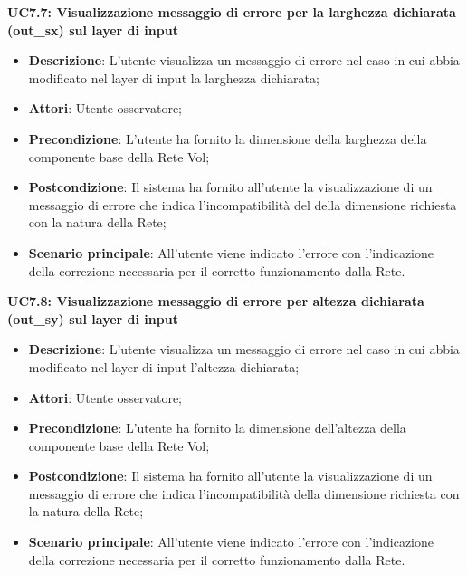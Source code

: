 \textbf{UC7.7: Visualizzazione messaggio di errore per la larghezza dichiarata (out\_sx) sul layer di input}\mbox{}
\label{UC7.7: Visualizzazione messaggio di errore per la larghezza dichiarata sul layer di input}
\noindent
\begin{itemize}
\item \textbf{Descrizione}: L'utente visualizza un messaggio di errore nel caso in cui abbia modificato nel layer di input la larghezza dichiarata;
\item \textbf{Attori}: Utente osservatore;
\item \textbf{Precondizione}: L'utente ha fornito la dimensione della larghezza della componente base della Rete Vol;
\item \textbf{Postcondizione}: Il sistema ha fornito all'utente la visualizzazione di un messaggio di errore che indica l'incompatibilit\`a del della dimensione richiesta con la natura della Rete;
\item \textbf{Scenario principale}: All'utente viene indicato l'errore con l'indicazione della correzione necessaria per il corretto funzionamento dalla Rete.
\end{itemize}

\textbf{UC7.8: Visualizzazione messaggio di errore per altezza dichiarata (out\_sy) sul layer di input}\mbox{}
\label{UC7.8: Visualizzazione messaggio di errore per altezza dichiarata sul layer di input}
\noindent
\begin{itemize}
\item \textbf{Descrizione}: L'utente visualizza un messaggio di errore nel caso in cui abbia modificato nel layer di input l'altezza dichiarata;
\item \textbf{Attori}: Utente osservatore;
\item \textbf{Precondizione}: L'utente ha fornito la dimensione dell'altezza della componente base della Rete Vol;
\item \textbf{Postcondizione}: Il sistema ha fornito all'utente la visualizzazione di un messaggio di errore che indica l'incompatibilit\`a della dimensione richiesta con la natura della Rete;
\item \textbf{Scenario principale}: All'utente viene indicato l'errore con l'indicazione della correzione necessaria per il corretto funzionamento dalla Rete.
\end{itemize}


